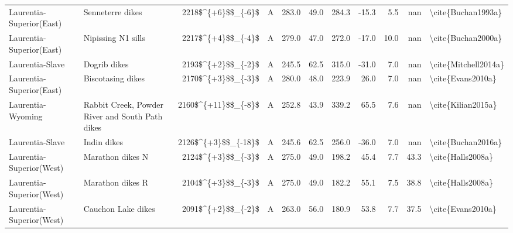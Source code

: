 \begin{longtable}{p{1 in}p{1 in}rrrrrrrr}
      Laurentia-Superior(East) &                                 Senneterre dikes &     2218\$\textasciicircum \{+6\}\$\$\_\{-6\}\$ &      A &     283.0 &      49.0 & 284.3 & -15.3 &       5.5 &         nan &                                 \textbackslash cite\{Buchan1993a\} \\
      Laurentia-Superior(East) &                               Nipissing N1 sills &     2217\$\textasciicircum \{+4\}\$\$\_\{-4\}\$ &      A &     279.0 &      47.0 & 272.0 & -17.0 &      10.0 &         nan &                                 \textbackslash cite\{Buchan2000a\} \\
               Laurentia-Slave &                                     Dogrib dikes &     2193\$\textasciicircum \{+2\}\$\$\_\{-2\}\$ &      A &     245.5 &      62.5 & 315.0 & -31.0 &       7.0 &         nan &                               \textbackslash cite\{Mitchell2014a\} \\
      Laurentia-Superior(East) &                                Biscotasing dikes &     2170\$\textasciicircum \{+3\}\$\$\_\{-3\}\$ &      A &     280.0 &      48.0 & 223.9 &  26.0 &       7.0 &         nan &                                  \textbackslash cite\{Evans2010a\} \\
             Laurentia-Wyoming &  Rabbit Creek, Powder River and South Path dikes &    2160\$\textasciicircum \{+11\}\$\$\_\{-8\}\$ &      A &     252.8 &      43.9 & 339.2 &  65.5 &       7.6 &         nan &                                 \textbackslash cite\{Kilian2015a\} \\
               Laurentia-Slave &                                      Indin dikes &    2126\$\textasciicircum \{+3\}\$\$\_\{-18\}\$ &      A &     245.6 &      62.5 & 256.0 & -36.0 &       7.0 &         nan &                                 \textbackslash cite\{Buchan2016a\} \\
      Laurentia-Superior(West) &                                 Marathon dikes N &     2124\$\textasciicircum \{+3\}\$\$\_\{-3\}\$ &      A &     275.0 &      49.0 & 198.2 &  45.4 &       7.7 &        43.3 &                                  \textbackslash cite\{Halls2008a\} \\
      Laurentia-Superior(West) &                                 Marathon dikes R &     2104\$\textasciicircum \{+3\}\$\$\_\{-3\}\$ &      A &     275.0 &      49.0 & 182.2 &  55.1 &       7.5 &        38.8 &                                  \textbackslash cite\{Halls2008a\} \\
      Laurentia-Superior(West) &                               Cauchon Lake dikes &     2091\$\textasciicircum \{+2\}\$\$\_\{-2\}\$ &      A &     263.0 &      56.0 & 180.9 &  53.8 &       7.7 &        37.5 &                                  \textbackslash cite\{Evans2010a\} \\

\end{longtable}
